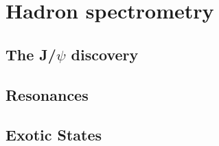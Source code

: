 \section{Hadron spectrometry}

\subsection{The J/$\psi$ discovery}

\subsection{Resonances}

\subsection{Exotic States}